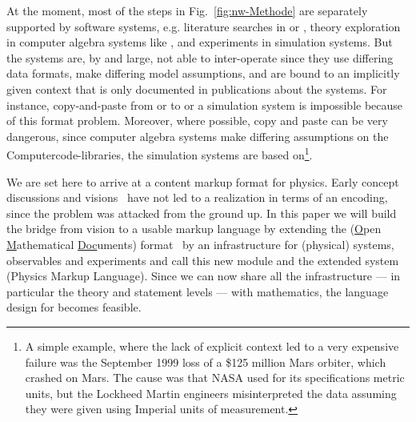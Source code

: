 At the moment, most of the steps in Fig.~\ref{fig:nw-Methode} are separately supported by
software systems, e.g.  literature searches in {\googlescholar} or {\wikipedia}, theory
exploration in computer algebra systems like {\mathematica}, and experiments in simulation
systems. But the systems are, by and large, not able to inter-operate since they use
differing data formats, make differing model assumptions, and are bound to an implicitly
given context that is only documented in publications about the systems. For instance,
copy-and-paste from {\googlescholar} or {\wikipedia} to {\mathematica} or a simulation
system is impossible because of this format problem. Moreover, where possible, copy and
paste can be very dangerous, since computer algebra systems make differing assumptions on
the Computercode-libraries, 
the simulation systems are based on\footnote{A simple example, where the lack of
explicit context led to a very expensive failure was the September 1999 loss of a \$125
million Mars orbiter, which crashed on Mars. The cause was that NASA used for its
specifications metric units, but the Lockheed Martin engineers misinterpreted the data
assuming they were given using Imperial units of measurement.}.

We are set here to arrive at a content markup format for physics. Early concept
discussions and visions~\cite{Hilf:texdocc,PML:web,Hilf:guestrow,Hilf:p05} have not led to
a realization in terms of an encoding, since the problem was attacked from the ground up.
In this paper we will build the bridge from vision to a usable markup language by
extending the {\omdoc} ({\underline{O}pen} {\underline{M}athematical}
{\underline{Doc}uments}) format~\cite{Kohlhase:omdoc1.2} by an infrastructure for
(physical) systems, observables and experiments and call this new module and the extended
system {\physml} (Physics Markup Language). Since we can now share all the infrastructure
--- in particular the theory and statement levels --- with mathematics, the language
design for {\physml} becomes feasible.



